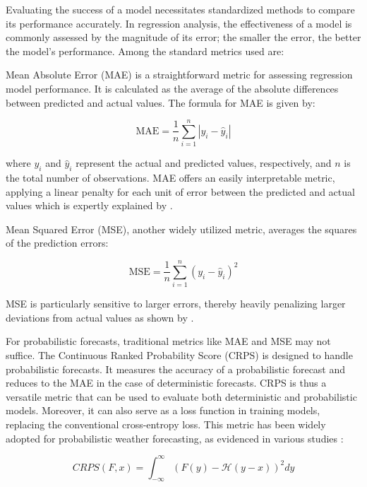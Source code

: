 \documentclass{article}
\begin{document}
Evaluating the success of a model necessitates standardized methods to compare its performance accurately. In regression analysis, the effectiveness of a model is commonly assessed by the magnitude of its error; the smaller the error, the better the model's performance. Among the standard metrics used are:

Mean Absolute Error (MAE) is a straightforward metric for assessing regression model performance. It is calculated as the average of the absolute differences between predicted and actual values. The formula for MAE is given by:

\begin{equation}\label{eq:MAE}
\text{MAE} = \frac{1}{n} \sum_{i=1}^{n} \left| y_i - \hat{y}_i \right|
\end{equation}


where $y_i$ and $\hat{y}_i$ represent the actual and predicted values, respectively, and $n$ is the total number of observations. MAE offers an easily interpretable metric, applying a linear penalty for each unit of error between the predicted and actual values which is expertly explained by \cite{MAE_RMSE}.

Mean Squared Error (MSE), another widely utilized metric, averages the squares of the prediction errors:

\begin{equation}\label{eq:MSE}
\text{MSE} = \frac{1}{n} \sum_{i=1}^{n} (y_i - \hat{y}_i)^2
\end{equation}

MSE is particularly sensitive to larger errors, thereby heavily penalizing larger deviations from actual values as shown by \cite{MSE}.

For probabilistic forecasts, traditional metrics like MAE and MSE may not suffice. The Continuous Ranked Probability Score (CRPS) is designed to handle probabilistic forecasts. It measures the accuracy of a probabilistic forecast and reduces to the MAE in the case of deterministic forecasts. CRPS is thus a versatile metric that can be used to evaluate both deterministic and probabilistic models. Moreover, it can also serve as a loss function in training models, replacing the conventional cross-entropy loss. This metric has been widely adopted for probabilistic weather forecasting, as evidenced in various studies \cite{CRPS_example_1, CRPS_example_2, CRPS_example_3}:

\begin{equation}\label{eq:CRPS}
    CRPS(F, x) = \int_{-\infty}^{\infty} ( F(y) - \mathcal{H}(y-x) )^{2} dy
\end{equation}
\end{document}
